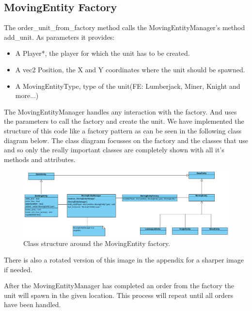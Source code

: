 \subsection{MovingEntity Factory}
The order\_unit\_from\_factory method calls the MovingEntityManager's method add\_unit. As parameters it provides:

\begin{itemize}  
\item A Player*, the player for which the unit has to be created.
\item A vec2 Position, the X and Y coordinates where the unit should be spawned.
\item A MovingEntityType, type of the unit(FE: Lumberjack, Miner, Knight and more...)
\end{itemize}
The MovingEntityManager handles any interaction with the factory. And uses the parameters to call the factory and create the unit. We have implemented the structure of this code like a factory pattern as can be seen in the following class diagram below. The class diagram focusses on the factory and the classes that use and so only the really important classes are completely shown with all it's methods and attributes.  
\begin{figure}[!htb]
    \centering
    \includegraphics[scale=0.55]{res/MovingEntityFactoryClass.png}
    \caption{Class structure around the MovingEntity factory.}
\end{figure}
\newpage
 
There is also a rotated version of this image in the appendix for a sharper image if needed.

After the MovingEntityManager has completed an order from the factory the unit will spawn in the given location. This process will repeat until all orders have been handled.




